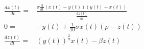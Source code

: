 \begin{align}
\frac{dx(t)}{dt} =& \frac{\sigma \mathrm{\frac{d}{d t}}\left( x\left( t \right) - y\left( t \right) \right) \left( y\left( t \right) - x\left( t \right) \right)}{\frac{dz(t)}{dt}} \\
0 =&  - y\left( t \right) + \frac{1}{10} \sigma x\left( t \right) \left( \rho - z\left( t \right) \right) \\
\frac{dz(t)}{dt} =& \left( y\left( t \right) \right)^{\frac{2}{3}} x\left( t \right) - \beta z\left( t \right)
\end{align}
